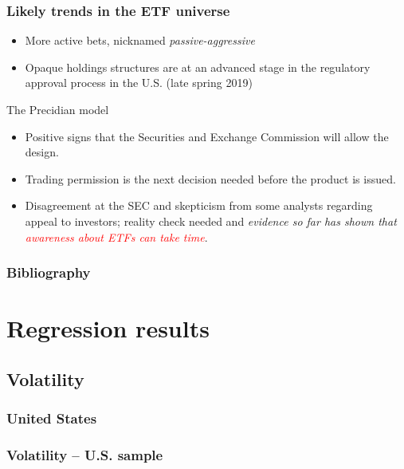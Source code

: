 \documentclass[9pt]{beamer}
\begin{document}
\begin{frame}[allowframebreaks]
  \frametitle{Likely trends in the ETF universe}
  \begin{itemize}
  \item More active bets, nicknamed \textit{passive-aggressive}
  \item Opaque holdings structures are at an advanced stage in the regulatory approval process in the U.S. (late spring 2019)
    
  \end{itemize}
  \begin{block}{The Precidian model}
    \begin{itemize}
    \item Positive signs that the Securities and Exchange Commission will allow the design.
    \item Trading permission is the next decision needed before the product is issued.
    \item Disagreement at the SEC and skepticism from some analysts regarding appeal to investors; reality check needed and \textit{evidence so far has shown that \textcolor{red}{awareness about ETFs can take time}}.
    \end{itemize}
    
  \end{block}
  
\end{frame}


\begin{frame}
  \frametitle{Bibliography}
  \printbibliography
\end{frame}
\appendix
\section{Regression results}
\subsection{Volatility}
\subsubsection{United States}
\begin{frame}[allowframebreaks, t]
  \frametitle{Volatility -- U.S. sample}
  \centering
    
\end{frame}
\end{document}
